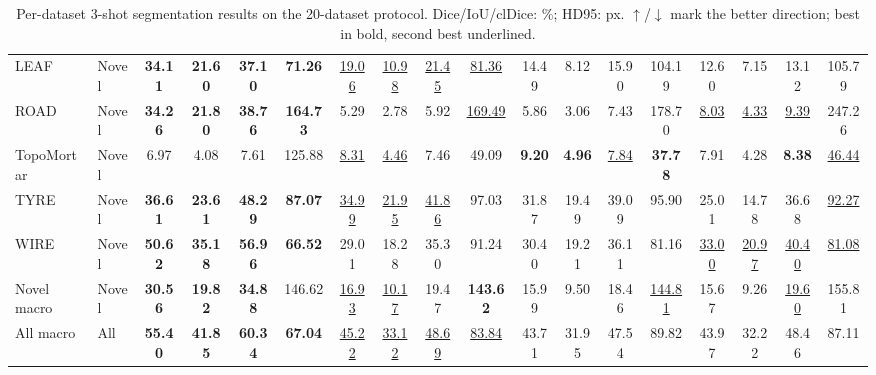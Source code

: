 \begin{table}[t]
{\begin{tabular}{llcccc|cccc|cccc|cccc}
LEAF & Novel & \textbf{34.11} & \textbf{21.60} & \textbf{37.10} & \textbf{71.26} & \underline{19.06} & \underline{10.98} & \underline{21.45} & \underline{81.36} & 14.49 & 8.12 & 15.90 & 104.19 & 12.60 & 7.15 & 13.12 & 105.79 \\
ROAD & Novel & \textbf{34.26} & \textbf{21.80} & \textbf{38.76} & \textbf{164.73} & 5.29 & 2.78 & 5.92 & \underline{169.49} & 5.86 & 3.06 & 7.43 & 178.70 & \underline{8.03} & \underline{4.33} & \underline{9.39} & 247.26 \\
TopoMortar & Novel & 6.97 & 4.08 & 7.61 & 125.88 & \underline{8.31} & \underline{4.46} & 7.46 & 49.09 & \textbf{9.20} & \textbf{4.96} & \underline{7.84} & \textbf{37.78} & 7.91 & 4.28 & \textbf{8.38} & \underline{46.44} \\
TYRE & Novel & \textbf{36.61} & \textbf{23.61} & \textbf{48.29} & \textbf{87.07} & \underline{34.99} & \underline{21.95} & \underline{41.86} & 97.03 & 31.87 & 19.49 & 39.09 & 95.90 & 25.01 & 14.78 & 36.68 & \underline{92.27} \\
WIRE & Novel & \textbf{50.62} & \textbf{35.18} & \textbf{56.96} & \textbf{66.52} & 29.01 & 18.28 & 35.30 & 91.24 & 30.40 & 19.21 & 36.11 & 81.16 & \underline{33.00} & \underline{20.97} & \underline{40.40} & \underline{81.08} \\
\midrule
Novel macro & Novel & \textbf{30.56} & \textbf{19.82} & \textbf{34.88} & 146.62 & \underline{16.93} & \underline{10.17} & 19.47 & \textbf{143.62} & 15.99 & 9.50 & 18.46 & \underline{144.81} & 15.67 & 9.26 & \underline{19.60} & 155.81 \\
\midrule
All macro & All & \textbf{55.40} & \textbf{41.85} & \textbf{60.34} & \textbf{67.04} & \underline{45.22} & \underline{33.12} & \underline{48.69} & \underline{83.84} & 43.71 & 31.95 & 47.54 & 89.82 & 43.97 & 32.22 & 48.46 & 87.11 \\
\bottomrule
\end{tabular}}
\caption{Per-dataset 3-shot segmentation results on the 20-dataset protocol.  Dice/IoU/clDice: \%; HD95: px. $\uparrow$/$\downarrow$ mark the better direction; best in bold, second best underlined.}
\label{tab:per-dataset}
\end{table}
